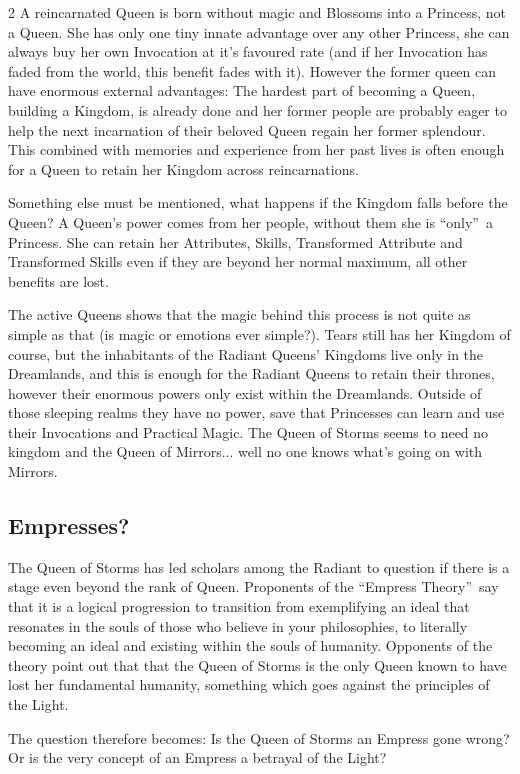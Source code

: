 \begin{multicols}{2}
A reincarnated Queen is born without magic and Blossoms into a Princess, not a Queen. She has only one tiny innate advantage over any other Princess, she can always buy her own Invocation at it's favoured rate (and if her Invocation has faded from the world, this benefit fades with it). However the former queen can have enormous external advantages: The hardest part of becoming a Queen, building a Kingdom, is already done and her former people are probably eager to help the next incarnation of their beloved Queen regain her former splendour. This combined with memories and experience from her past lives is often enough for a Queen to retain her Kingdom across reincarnations. 

Something else must be mentioned, what happens if the Kingdom falls before the Queen? A Queen's power comes from her people, without them she is \textquotedblleft only\textquotedblright\, a Princess. She can retain her Attributes, Skills, Transformed Attribute and Transformed Skills even if they are beyond her normal maximum, all other benefits are lost. 

The active Queens shows that the magic behind this process is not quite as simple as that (is magic or emotions ever simple?). Tears still has her Kingdom of course, but the inhabitants of the Radiant Queens' Kingdoms live only in the Dreamlands, and this is enough for the Radiant Queens to retain their thrones, however their enormous powers only exist within the Dreamlands. Outside of those sleeping realms they have no power, save that Princesses can learn and use their Invocations and Practical Magic. The Queen of Storms seems to need no kingdom and the Queen of Mirrors... well no one knows what's going on with Mirrors. 

\begin{mybox}

\subsection*{Empresses?}

The Queen of Storms has led scholars among the Radiant to question if there is a stage even beyond the rank of Queen. Proponents of the \textquotedblleft Empress Theory\textquotedblright\, say that it is a logical progression to transition from exemplifying an ideal that resonates in the souls of those who believe in your philosophies, to literally becoming an ideal and existing within the souls of humanity. Opponents of the theory point out that that the Queen of Storms is the only Queen known to have lost her fundamental humanity, something which goes against the principles of the Light.

The question therefore becomes: Is the Queen of Storms an Empress gone wrong? Or is the very concept of an Empress a betrayal of the Light?
\end{mybox}

\end{multicols}
